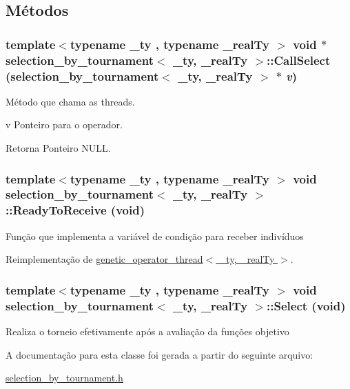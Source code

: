 \subsection{Métodos}
\hypertarget{classselection__by__tournament_ad754f7c3afa1443bfed139265cd506c1}{
\subsubsection[{CallSelect}]{\setlength{\rightskip}{0pt plus 5cm}template$<$typename \_\-ty , typename \_\-realTy $>$ void $\ast$ {\bf selection\_\-by\_\-tournament}$<$ \_\-ty, \_\-realTy $>$::CallSelect ({\bf selection\_\-by\_\-tournament}$<$ \_\-ty, \_\-realTy $>$ $\ast$ {\em v})}}
\label{classselection__by__tournament_ad754f7c3afa1443bfed139265cd506c1}
Método que chama as threads.

v Ponteiro para o operador.

\begin{DoxyReturn}{Retorna}
Ponteiro NULL. 
\end{DoxyReturn}
\hypertarget{classselection__by__tournament_a3e16cf77dd481a3ce1a01ac4edffa4ba}{
\subsubsection[{ReadyToReceive}]{\setlength{\rightskip}{0pt plus 5cm}template$<$typename \_\-ty , typename \_\-realTy $>$ void {\bf selection\_\-by\_\-tournament}$<$ \_\-ty, \_\-realTy $>$::ReadyToReceive (void)}}
\label{classselection__by__tournament_a3e16cf77dd481a3ce1a01ac4edffa4ba}
Função que implementa a variável de condição para receber indivíduos 

Reimplementação de \hyperlink{classgenetic__operator__thread_a7c86cee81334320d496fb196920fcc10}{genetic\_\-operator\_\-thread$<$ \_\-ty, \_\-realTy $>$}.

\hypertarget{classselection__by__tournament_aa2a32fdcbd6365eea3e40a565c9cff3a}{
\subsubsection[{Select}]{\setlength{\rightskip}{0pt plus 5cm}template$<$typename \_\-ty , typename \_\-realTy $>$ void {\bf selection\_\-by\_\-tournament}$<$ \_\-ty, \_\-realTy $>$::Select (void)}}
\label{classselection__by__tournament_aa2a32fdcbd6365eea3e40a565c9cff3a}
Realiza o torneio efetivamente após a avaliação da funções objetivo 

A documentação para esta classe foi gerada a partir do seguinte arquivo:\begin{DoxyCompactItemize}
\item 
\hyperlink{selection__by__tournament_8h}{selection\_\-by\_\-tournament.h}\end{DoxyCompactItemize}
